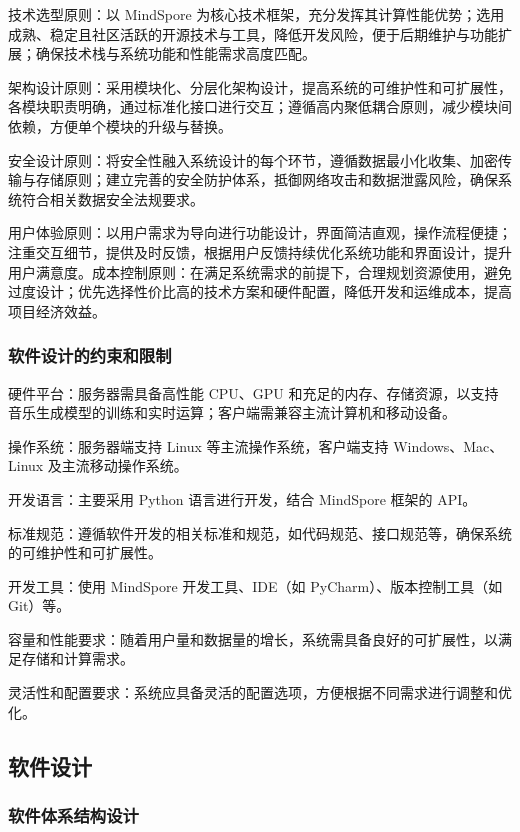 \documentclass{base}
\begin{document}
技术选型原则：以 MindSpore 为核心技术框架，充分发挥其计算性能优势；选用成熟、稳定且社区活跃的开源技术与工具，降低开发风险，便于后期维护与功能扩展；确保技术栈与系统功能和性能需求高度匹配。​

架构设计原则：采用模块化、分层化架构设计，提高系统的可维护性和可扩展性，各模块职责明确，通过标准化接口进行交互；遵循高内聚低耦合原则，减少模块间依赖，方便单个模块的升级与替换。​

安全设计原则：将安全性融入系统设计的每个环节，遵循数据最小化收集、加密传输与存储原则；建立完善的安全防护体系，抵御网络攻击和数据泄露风险，确保系统符合相关数据安全法规要求。​

用户体验原则：以用户需求为导向进行功能设计，界面简洁直观，操作流程便捷；注重交互细节，提供及时反馈，根据用户反馈持续优化系统功能和界面设计，提升用户满意度。​
成本控制原则：在满足系统需求的前提下，合理规划资源使用，避免过度设计；优先选择性价比高的技术方案和硬件配置，降低开发和运维成本，提高项目经济效益。

\subsubsection{软件设计的约束和限制}

硬件平台：服务器需具备高性能 CPU、GPU 和充足的内存、存储资源，以支持音乐生成模型的训练和实时运算；客户端需兼容主流计算机和移动设备。

操作系统：服务器端支持 Linux 等主流操作系统，客户端支持 Windows、Mac、Linux 及主流移动操作系统。

开发语言：主要采用 Python 语言进行开发，结合 MindSpore 框架的 API。

标准规范：遵循软件开发的相关标准和规范，如代码规范、接口规范等，确保系统的可维护性和可扩展性。

开发工具：使用 MindSpore 开发工具、IDE（如 PyCharm）、版本控制工具（如 Git）等。

容量和性能要求：随着用户量和数据量的增长，系统需具备良好的可扩展性，以满足存储和计算需求。

灵活性和配置要求：系统应具备灵活的配置选项，方便根据不同需求进行调整和优化。

\subsection{软件设计}

\subsubsection{软件体系结构设计}
\end{document}
